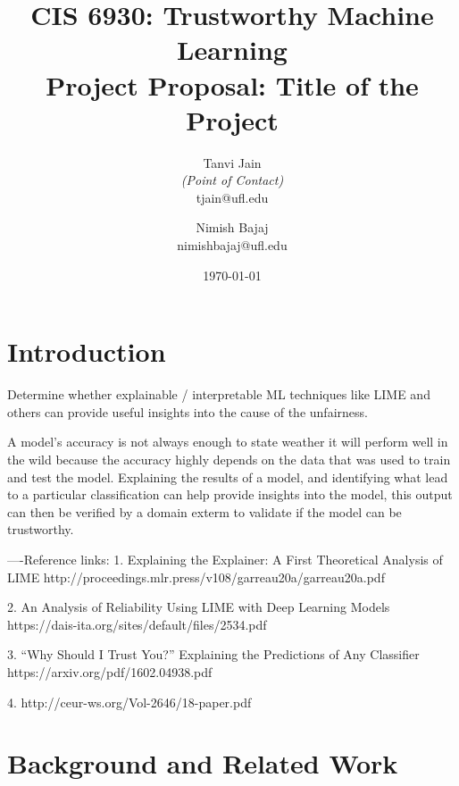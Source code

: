 \documentclass[11pt,letterpaper]{article}
\title{CIS 6930: Trustworthy Machine Learning\\
	\Large Project Proposal: Title of the Project} %
\author{
        Tanvi Jain \\{\em (Point of Contact)} \\
        tjain@ufl.edu\\
        \and
        Nimish Bajaj \\
        nimishbajaj@ufl.edu\\
}
\date{\today}
\begin{document}

\maketitle




\section{Introduction}


Determine whether explainable / interpretable ML techniques like LIME and others can provide useful insights into the cause of the unfairness.

A model's accuracy is not always enough to state weather it will perform well in the wild because the accuracy highly depends on the data that was used to train and test the model. Explaining the results of a model, and identifying what lead to a particular classification can help provide insights into the model, this output can then be verified by a domain exterm to validate if the model can be trustworthy.


----Reference links:
1. Explaining the Explainer: A First Theoretical Analysis of LIME 
http://proceedings.mlr.press/v108/garreau20a/garreau20a.pdf

2. An Analysis of Reliability Using LIME with Deep Learning Models 
https://dais-ita.org/sites/default/files/2534.pdf

3. “Why Should I Trust You?” Explaining the Predictions of Any Classifier 
https://arxiv.org/pdf/1602.04938.pdf

4. http://ceur-ws.org/Vol-2646/18-paper.pdf

\section{Background and Related Work}
\end{document}
